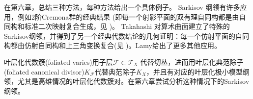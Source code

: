 在第六章，总结三种方法，每种方法给出一个具体例子。 Sarkisov 纲领有许多应用，例如2阶Cremona群的经典结果 (即每一个射影平面的双有理自同构都是由自同构和标准二次映射复合生成，见 \cite[Chapter 2]{ksc04} )。 Takahashi \cite{tak95} 对算术曲面建立了特殊的Sarkisov纲领，并得到了另一个经典代数结论的几何证明：每一个仿射平面的自同构都由仿射自同构和上三角变换复合(见 \cite[Chpter 13]{mat02})。Lamy\cite{lam22}给出了更多其他应用。

叶层化代数簇(foliated varies)用子层$\mathcal{F} \subset \mathcal{T}_{X}$ 代替切丛，进而用叶层化典范除子(foliated canonical divisor)$K_{\mathcal{F}}$代替典范除子$K_{X}$，并且有对应的叶层化极小模型纲领，尤其是高维情况的叶层化代数簇对。在第六章尝试分析这种情况下的Sarkisov纲领。




